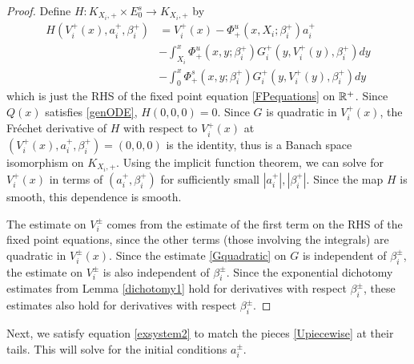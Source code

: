 \documentclass[thesis.tex]{subfiles}
\begin{document}
\begin{lemma}
\begin{proof}
Define $H: K_{X_i, +} \times E_0^s \rightarrow K_{X_i, +}$ by
\begin{align*}
H(V_i^+(x), a_i^+, \beta_i^+) &= V_i^+(x) - \Phi^u_+(x, X_i; \beta_i^+) a_i^+  \\
&- \int_{X_i}^x \Phi_+^u(x, y; \beta_i^+) G_i^+(y, V_i^+(y),\beta_i^+)dy \\
&- \int_0^x \Phi_+^s(x, y; \beta_i^+) G_i^+(y, V_i^+(y),\beta_i^+)dy 
\end{align*}
which is just the RHS of the fixed point equation \eqref{FPequations} on $\mathbb{R}^+$. Since $Q(x)$ satisfies \eqref{genODE}, $H(0, 0, 0) = 0$. Since $G$ is quadratic in $V_i^+(x)$, the Fr\'echet derivative of $H$ with respect to $V_i^+(x)$ at $(V_i^+(x), a_i^+, \beta_i^+) = (0, 0, 0)$ is the identity, thus is a Banach space isomorphism on $K_{X_i, +}$. Using the implicit function theorem, we can solve for $V_i^+(x)$ in terms of $(a_i^+, \beta_i^+)$ for sufficiently small $|a_i^+|, |\beta_i^+|$. Since the map $H$ is smooth, this dependence is smooth.

The estimate on $V_i^\pm$ comes from the estimate of the first term on the RHS of the fixed point equations, since the other terms (those involving the integrals) are quadratic in $V_i^\pm(x)$. Since the estimate \eqref{Gquadratic} on $G$ is independent of $\beta_i^\pm$, the estimate on {}$V_i^\pm$ is also independent of $\beta_i^\pm$. Since the exponential dichotomy estimates from Lemma \ref{dichotomy1} hold for derivatives with respect $\beta_i^\pm$, these estimates also hold for derivatives with respect $\beta_i^\pm$.
\end{proof}
\end{lemma}

Next, we satisfy equation \eqref{exsystem2} to match the pieces \eqref{Upiecewise} at their tails. This will solve for the initial conditions $a_i^\pm$.

\end{document}
